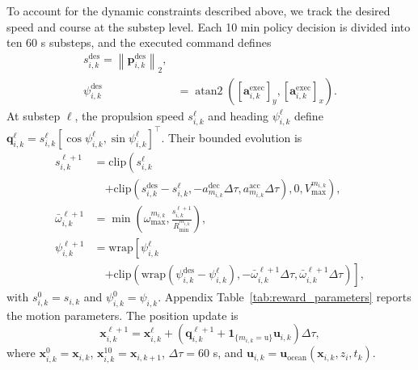 \documentclass[a4paper,fleqn]{cas-dc}
\begin{document}
To account for the dynamic constraints described above, we track the desired
speed and course at the substep level. Each 10 min policy decision is divided
into ten 60 s substeps, and the executed command defines
\begin{equation}
\begin{aligned}
s_{i,k}^{\mathrm{des}}
=\left\|\mathbf{p}_{i,k}^{\mathrm{des}}\right\|_2,\\
\psi_{i,k}^{\mathrm{des}}
&=\operatorname{atan2}
\left([\mathbf{a}_{i,k}^{\mathrm{exec}}]_y,
[\mathbf{a}_{i,k}^{\mathrm{exec}}]_x\right).
\end{aligned}
\label{eq:constrained_desired_speed_course}
\end{equation}
At substep \(\ell\), the propulsion speed \(s_{i,k}^{\ell}\) and heading
\(\psi_{i,k}^{\ell}\) define
\(\mathbf{q}_{i,k}^{\ell}
=s_{i,k}^{\ell}[\cos\psi_{i,k}^{\ell},\sin\psi_{i,k}^{\ell}]^{\top}\).
Their bounded evolution is
\begin{equation}
\begin{aligned}
s_{i,k}^{\ell+1}
&=\mathrm{clip}\!\left(
s_{i,k}^\ell\right.\\
&\quad\left.+
\mathrm{clip}\!\left(
s_{i,k}^{\mathrm{des}}-s_{i,k}^\ell,
-a_{m_{i,k}}^{\mathrm{dec}}\Delta\tau,
a_{m_{i,k}}^{\mathrm{acc}}\Delta\tau
\right),
0,V_{\max}^{m_{i,k}}
\right),\\
\bar\omega_{i,k}^{\ell+1}
&=\min\left(\omega_{\max}^{m_{i,k}},
\frac{s_{i,k}^{\ell+1}}{R_{\min}^{m_{i,k}}}\right),\\
\psi_{i,k}^{\ell+1}
&=\mathrm{wrap}\!\left[
\psi_{i,k}^\ell\right.\\
&\quad\left.+
\mathrm{clip}\!\left(
\mathrm{wrap}
\left(\psi_{i,k}^{\mathrm{des}}-\psi_{i,k}^\ell\right),
-\bar\omega_{i,k}^{\ell+1}\Delta\tau,
\bar\omega_{i,k}^{\ell+1}\Delta\tau
\right)
\right],
\end{aligned}
\label{eq:constrained_dynamics}
\end{equation}
with \(s_{i,k}^{0}=s_{i,k}\) and \(\psi_{i,k}^{0}=\psi_{i,k}\).
Appendix Table~\ref{tab:reward_parameters} reports the motion parameters.
The position update is
\begin{equation}
\mathbf{x}_{i,k}^{\ell+1}
=
\mathbf{x}_{i,k}^{\ell}+
\left(
\mathbf{q}_{i,k}^{\ell+1}+
\mathbf{1}_{\{m_{i,k}=\mathrm{u}\}}\mathbf{u}_{i,k}
\right)\Delta\tau,
\label{eq:constrained_substep_translation}
\end{equation}
where \(\mathbf{x}_{i,k}^{0}=\mathbf{x}_{i,k}\),
\(\mathbf{x}_{i,k}^{10}=\mathbf{x}_{i,k+1}\), \(\Delta\tau=60\) s, and
\(\mathbf{u}_{i,k}=
\mathbf{u}_{\mathrm{ocean}}(\mathbf{x}_{i,k},z_i,t_k)\).
\end{document}
